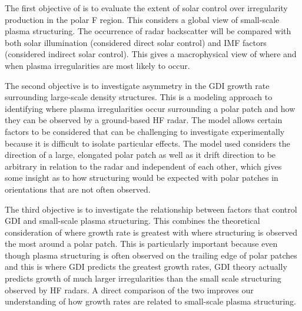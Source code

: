 The first objective of is to evaluate the extent of solar control over irregularity production in the polar F region.  This considers a global view of small-scale plasma structuring.  The occurrence of radar backscatter will be compared with both solar illumination (considered direct solar control) and IMF factors (considered indirect solar control).  This gives a macrophysical view of where and when plasma irregularities are most likely to occur.

The second objective is to investigate asymmetry in the GDI growth rate surrounding large-scale density structures.  This is a modeling approach to identifying where plasma irregularities occur surrounding a polar patch and how they can be observed by a ground-based HF radar.  The model allows certain factors to be considered that can be challenging to investigate experimentally because it is difficult to isolate particular effects.  The model used considers the direction of a large, elongated polar patch as well as it drift direction to be arbitrary in relation to the radar and independent of each other, which gives some insight as to how structuring would be expected with polar patches in orientations that are not often observed.

The third objective is to investigate the relationship between factors that control GDI and small-scale plasma structuring.  This combines the theoretical consideration of where growth rate is greatest with where structuring is observed the most around a polar patch.  This is particularly important because even though plasma structuring is often observed on the trailing edge of polar patches and this is where GDI predicts the greatest growth rates, GDI theory actually predicts growth of much larger irregularities than the small scale structuring observed by HF radars.  A direct comparison of the two improves our understanding of how growth rates are related to small-scale plasma structuring.

